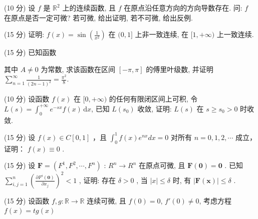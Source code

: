 (10 分) 设 $f$ 是 $\mathbb{R}^2$ 上的连续函数, 且 $f$ 在原点沿任意方向的方向导数存在. 问: $f$ 在原点是否一定可微? 若可微, 给出证明, 若不可微, 给出反例.\par
(15 分) 证明: $f(x) = \sin \left( \frac{1}{x^2} \right)$ 在 $(0,1]$ 上非一致连续, 在 $[1, +\infty)$ 上一致连续.\par
\par{}
(15 分) 已知函数\par
\nopagebreak[4]
其中 $A \neq 0$ 为常数, 求该函数在区间 $[- \pi, \pi]$ 的傅里叶级数, 并证明 $\sum_{n=1}^{\infty} \frac{1}{(2n-1)^2} = \frac{\pi^2}{8}$.\par
(10 分) 设函数 $f(x)$ 在 $[0, +\infty)$ 的任何有限闭区间上可积, 令 $L(s) = \int_{0}^{+\infty} e^{-sx} f(x) \, \mathrm{d}x$, 已知 $L(s_0)$ 收敛, 证明: $L(s)$ 在 $s \geq s_0 > 0$ 时收敛.\par
(15 分) 设  $f(x) \in C[0,1]$ ，且  $\int_{0}^{1} f(x)e^{nx} dx = 0$  对所有  $n = 0, 1, 2, \cdots$  成立，证明： $f(x) \equiv 0$ .\par
(15 分) 设  $\boldsymbol{F} = (F^{1}, F^{2}, \cdots, F^{n})$ :  $R^{n} \to R^{n}$  在原点可微, 且  $\boldsymbol{F}(\boldsymbol{0}) = \boldsymbol{0}$ . 已知  $\sum_{i,j=1}^{n} \left( \frac{\partial F^{i}(\boldsymbol{0})}{\partial x_{j}} \right)^{2} < 1$ , 证明: 存在  $\delta > 0$ , 当  $|x| \leq \delta$  时, 有  $|\boldsymbol{F}(\boldsymbol{x})| \leq \delta$ .\par
(15 分) 设函数 $f, g: \mathbb{R} \to \mathbb{R}$ 连续可微, 且 $f(0) = 0$, $f'(0) \neq 0$, 考虑方程 $f(x) = tg(x)$\par
